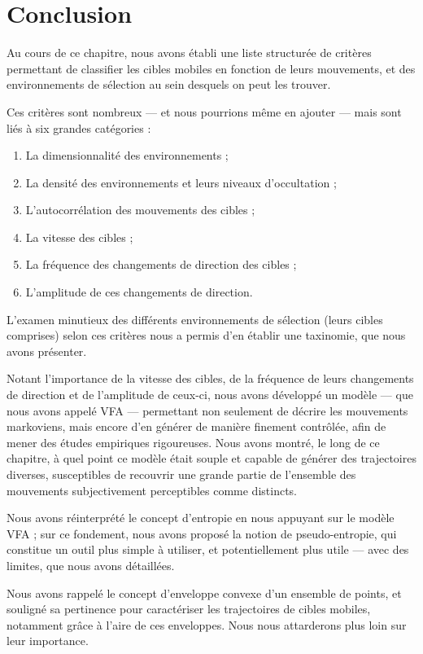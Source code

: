 \section{Conclusion}
	Au cours de ce chapitre, nous avons établi une liste structurée de critères permettant de classifier les cibles mobiles en fonction de leurs mouvements, et des environnements de sélection au sein desquels on peut les trouver.
	
	Ces critères sont nombreux --- et nous pourrions même en ajouter --- mais sont liés à six grandes catégories :
	
	\begin{enumerate}
		\item La dimensionnalité des environnements ;
		\item La densité des environnements et leurs niveaux d'occultation ;
		\item L'autocorrélation des mouvements des cibles ;
		\item La vitesse des cibles ;
		\item La fréquence des changements de direction des cibles ;
		\item L'amplitude de ces changements de direction.
	\end{enumerate}
	
	L'examen minutieux des différents environnements de sélection (leurs cibles comprises) selon ces critères nous a permis d'en établir une taxinomie, que nous avons présenter.
	
	Notant l'importance de la vitesse des cibles, de la fréquence de leurs changements de direction et de l'amplitude de ceux-ci, nous avons développé un modèle --- que nous avons appelé VFA --- permettant non seulement de décrire les mouvements markoviens, mais encore d'en générer de manière finement contrôlée, afin de mener des études empiriques rigoureuses. Nous avons montré, le long de ce chapitre, à quel point ce modèle était souple et capable de générer des trajectoires diverses, susceptibles de recouvrir une grande partie de l'ensemble des mouvements subjectivement perceptibles comme distincts.
	
	Nous avons réinterprété le concept d'entropie en nous appuyant sur le modèle VFA ; sur ce fondement, nous avons proposé la notion de pseudo-entropie, qui constitue un outil plus simple à utiliser, et potentiellement plus utile --- avec des limites, que nous avons détaillées.	
	
	Nous avons rappelé le concept d'enveloppe convexe d'un ensemble de points, et souligné sa pertinence pour caractériser les trajectoires de cibles mobiles, notamment grâce à l'aire de ces enveloppes. Nous nous attarderons plus loin sur leur importance.
	
